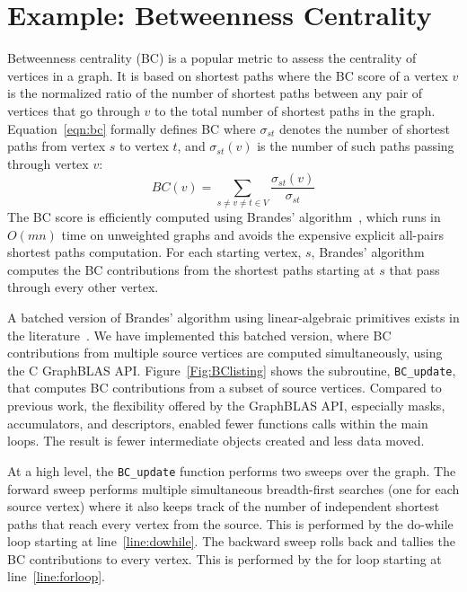 \section{Example: Betweenness Centrality}
\label{sec:example}


Betweenness centrality (BC) is a popular metric to assess the centrality of 
vertices in a graph. It is based on shortest paths where the BC score of a
vertex $v$ is the normalized ratio of the number of shortest paths between 
any pair of vertices that go through $v$ to the total number of shortest paths 
in the graph.  Equation~\ref{eqn:bc} formally defines BC where $\sigma_{st}$ 
denotes the number of shortest paths from vertex $s$ to vertex $t$, and 
$\sigma_{st}(v)$ is the number of such paths passing through vertex $v$:
\begin{equation}
	BC(v) = \sum_{s \neq v \neq t \in V} \frac{\sigma_{st}(v)}{\sigma_{st}}
\label{eqn:bc}
\end{equation}
The BC score is efficiently computed using Brandes' 
algorithm~\cite{brandes2001faster}, 
which runs in $O(mn)$ time on unweighted graphs and avoids the expensive 
explicit all-pairs shortest paths computation.  For each starting vertex, $s$, 
Brandes' algorithm computes the BC contributions from the shortest paths starting
at $s$ that pass through every other vertex.

A batched version of Brandes' algorithm using linear-algebraic primitives
exists in the literature~\cite{combblas,bader2006designing,robinson2011complex}. 
We have implemented this batched version, where BC contributions from multiple 
source vertices are computed simultaneously, using the C GraphBLAS API. 
Figure~\ref{Fig:BClisting} shows the subroutine, {\tt BC\_update}, that computes
BC contributions from a subset of source vertices. Compared to previous work, the 
flexibility offered by the GraphBLAS API, especially masks, accumulators, 
and descriptors, enabled fewer functions calls within the main loops. The 
result is fewer intermediate objects created and less data moved.

At a high level, the {\tt BC\_update} function performs two sweeps over the 
graph. The forward sweep performs multiple simultaneous
breadth-first searches (one for each source vertex) where it also keeps track 
of the number of independent shortest paths that reach every vertex from 
the source. This is performed by the do-while loop starting at 
line~\ref{line:dowhile}. The backward sweep rolls back and tallies the BC 
contributions to every vertex. This is performed by the for loop starting 
at line~\ref{line:forloop}.  

